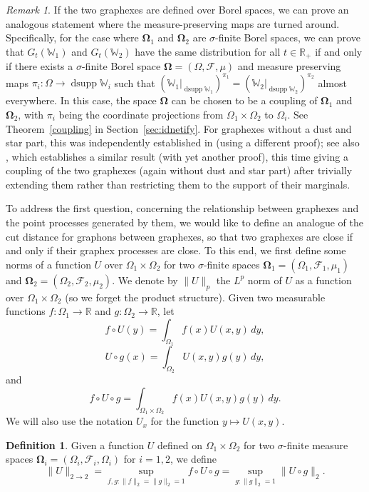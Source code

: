 \documentclass{amsart}
\numberwithin{equation}{section}
\numberwithin{figure}{section}
\theoremstyle{definition}
\newtheorem{definition}[theorem]{Definition}
\theoremstyle{remark}
\newtheorem{remark}[theorem]{Remark}
\DeclareMathOperator{\dsupp}{dsupp}
\newcommand{\bOmega}{{\mathbf{\Omega}}}
\newcommand{\RR}{\mathbb{R}}
\newcommand{\cW}{\mathbb{W}}
\newcommand{\cF}{\mathcal{F}}
\begin{document}
\begin{remark}\label{rem:identify}
If the two graphexes are defined over Borel spaces, we can prove an analogous
statement where the measure-preserving maps are turned around. Specifically,
for the case where $\bOmega_1$ and $\bOmega_2$ are $\sigma$-finite Borel
spaces, we can prove that $G_t(\cW_1)$ and $G_t(\cW_2)$ have the same
distribution for all $t\in\RR_+$ if and only if there exists a
$\sigma$-finite Borel space $\bOmega=(\Omega,\cF,\mu)$ and measure preserving
maps $\pi_i\colon \Omega \rightarrow\dsupp \cW_i$ such that $(\cW_1|_{\dsupp
\cW_1})^{\pi_1}=(\cW_2|_{\dsupp \cW_2})^{\pi_2}$ almost everywhere. In this
case, the space $\bOmega$ can be chosen to be a coupling of $\bOmega_1$ and
$\bOmega_2$, with $\pi_i$ being the coordinate projections from
$\Omega_1\times\Omega_2$ to $\Omega_i$. See Theorem~\ref{coupling} in
Section~\ref{sec:idnetify}. For graphexes without a dust and star part, this
was independently established in \cite{BCCH16} (using a different proof); see
also \cite{JANSON16}, which establishes a similar result (with yet another
proof), this time giving a coupling of the two graphexes (again without dust
and star part) after trivially extending them rather than restricting them to
the support of their marginals.
\end{remark}

To address the first question, concerning the relationship between graphexes
and the point processes generated by them, we would like to define an
analogue of the cut distance for graphons between graphexes, so that two
graphexes are close if and only if their graphex processes are close. To this
end, we first define some norms of a function $U$ over $\Omega_1 \times
\Omega_2$ for two $\sigma$-finite spaces $\bOmega_1=(\Omega_1,\cF_1,\mu_1)$
and $\bOmega_2=(\Omega_2,\cF_2,\mu_2)$. We denote by $\|U\|_p$ the $L^p$ norm
of $U$ as a function over $\Omega_1 \times \Omega_2$ (so we forget the
product structure). Given two measurable functions $f\colon \Omega_1\to\RR$
and $g\colon \Omega_2\to\RR$, let
\[f \circ U(y)= \int_{\Omega_1} f(x)U(x,y)\,dy,\]
\[U \circ g(x)= \int_{\Omega_2} U(x,y)g(y)\,dy,\]
and
\[f \circ U \circ g= \int_{\Omega_1 \times\Omega_2} f(x)U(x,y)g(y)\,dy.\]
We will also use the notation $U_x$ for the function $y\mapsto U(x,y)$.

\begin{definition}\label{def:kernel-norm}
Given a function $U$ defined on $\Omega_1 \times \Omega_2$ for two
$\sigma$-finite measure spaces $\bOmega_i=(\Omega_i,\cF_i,\Omega_i)$ for
$i=1,2$, we define
\[\|U\|_{2 \rightarrow 2}=\sup_{f,g:\|f\|_2=\|g\|_2=1} f \circ U \circ g
=\sup_{g:\|g\|_2=1} \|U \circ g\|_2.\]
\end{definition}
\end{document}
